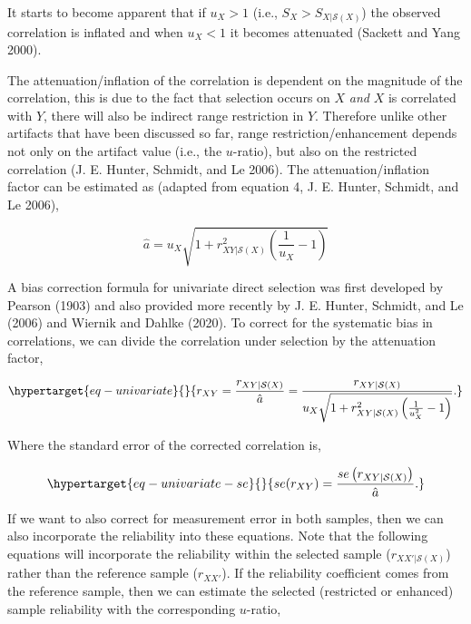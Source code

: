 \documentclass[
  letterpaper,
  DIV=11,
  numbers=noendperiod]{scrreprt}
\begin{document}
It starts to become apparent that if \(u_X>1\) (i.e.,
\(S_X>S_{X|\mathcal{S}(X)}\)) the observed correlation is inflated and
when \(u_X<1\) it becomes attenuated (Sackett and Yang 2000).

The attenuation/inflation of the correlation is dependent on the
magnitude of the correlation, this is due to the fact that selection
occurs on \(X\) \emph{and} \(X\) is correlated with \(Y\), there will
also be indirect range restriction in \(Y\). Therefore unlike other
artifacts that have been discussed so far, range restriction/enhancement
depends not only on the artifact value (i.e., the \(u\)-ratio), but also
on the restricted correlation (J. E. Hunter, Schmidt, and Le 2006). The
attenuation/inflation factor can be estimated as (adapted from equation
4, J. E. Hunter, Schmidt, and Le 2006),

\[
\hat{a} = u_X \sqrt{1+r_{XY|\mathcal{S}(X)}^2\left(\frac{1}{u_X}-1\right)}
\]

A bias correction formula for univariate direct selection was first
developed by Pearson (1903) and also provided more recently by J. E.
Hunter, Schmidt, and Le (2006) and Wiernik and Dahlke (2020). To correct
for the systematic bias in correlations, we can divide the correlation
under selection by the attenuation factor,

\begin{equation}\protect\hypertarget{eq-univariate}{}{
r_{XY} = \frac{r_{XY|\mathcal{S}(X)}}{\hat{a}} = \frac{r_{XY|\mathcal{S}(X)}}{u_X\sqrt{1+r_{XY|\mathcal{S}(X)}^2\left(\frac{1}{u^2_X}-1\right)}}.
}\label{eq-univariate}\end{equation}

Where the standard error of the corrected correlation is,

\begin{equation}\protect\hypertarget{eq-univariate-se}{}{
se(r_{XY}) = \frac{se\left(r_{XY|\mathcal{S}(X)}\right)}{\hat{a}}.
}\label{eq-univariate-se}\end{equation}

If we want to also correct for measurement error in both samples, then
we can also incorporate the reliability into these equations. Note that
the following equations will incorporate the reliability within the
selected sample (\(r_{XX'|\mathcal{S}(X)}\)) rather than the reference
sample (\(r_{XX'}\)). If the reliability coefficient comes from the
reference sample, then we can estimate the selected (restricted or
enhanced) sample reliability with the corresponding \(u\)-ratio,
\end{document}
